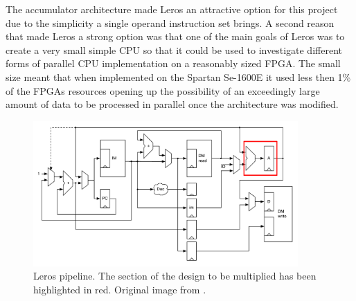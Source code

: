 The accumulator architecture made Leros an attractive option for this project
due to 
the simplicity a single operand instruction set brings. A second reason that
made Leros a strong option was that one of the main goals of Leros was to create
a very small simple CPU so that it could be used to investigate different forms
of parallel CPU implementation on a reasonably sized FPGA. The small size meant
that when implemented on the Spartan Se-1600E it used less then 1\% of the FPGAs
resources opening up the possibility of an exceedingly large amount of data to
be processed in parallel once the architecture was modified.
 
\begin{figure}[h]
\center
\includegraphics[width=0.9\textwidth]{images/leros-system}
\caption{Leros pipeline. The section of the design to be multiplied has been
highlighted in red. Original image from \cite{schoeberlleros}.
}
\label{fig:leros-system}
\end{figure}
